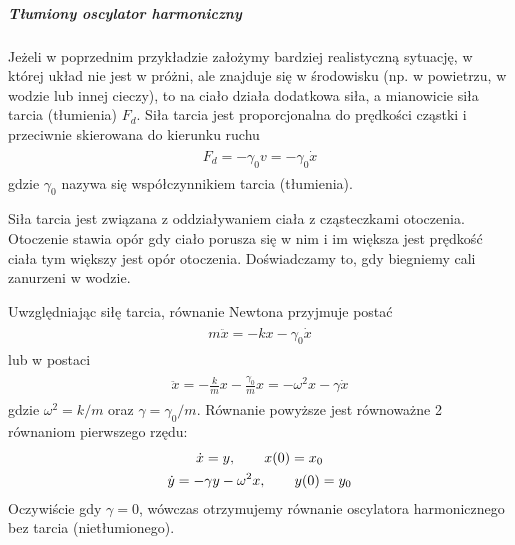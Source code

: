 \documentclass[a4paper,12pt,polish]{sphinxmanual}
\begin{document}
\subparagraph{Tłumiony oscylator harmoniczny}
\label{ch1/chI021:tlumiony-oscylator-harmoniczny}
Jeżeli w poprzednim przykładzie założymy bardziej realistyczną sytuację, w której  układ nie jest w próżni, ale znajduje się w środowisku (np. w powietrzu, w wodzie lub innej cieczy), to na ciało działa dodatkowa siła, a mianowicie siła tarcia  (tłumienia) $F_d$. Siła tarcia jest proporcjonalna do prędkości cząstki i przeciwnie skierowana do kierunku ruchu
\label{ch1/chI021:equation-eqn57}\begin{gather}
\begin{split}F_d = -\gamma_0 v = -\gamma_0 \dot x\end{split}\label{ch1/chI021-eqn57}
\end{gather}
gdzie $\gamma_0$ nazywa się współczynnikiem tarcia (tłumienia).

Siła tarcia jest związana z oddziaływaniem ciała z cząsteczkami otoczenia. Otoczenie stawia opór gdy ciało porusza się w nim i im większa jest prędkość ciała tym większy jest opór otoczenia. Doświadczamy to, gdy biegniemy cali zanurzeni w wodzie.

Uwzględniając siłę tarcia, równanie Newtona przyjmuje postać
\label{ch1/chI021:equation-eqn58}\begin{gather}
\begin{split}m\ddot x = -kx - \gamma_0 \dot x\end{split}\label{ch1/chI021-eqn58}
\end{gather}
lub w postaci
\label{ch1/chI021:equation-eqn58a}\begin{gather}
\begin{split}\ddot x = -\frac{k}{m} x - \frac{\gamma_0}{m} x = -\omega^2 x - \gamma \dot x\end{split}\label{ch1/chI021-eqn58a}
\end{gather}
gdzie $\omega^2 = k/m$  oraz $\gamma = \gamma_0/m$. Równanie  powyższe  jest równoważne 2 równaniom pierwszego rzędu:
\label{ch1/chI021:equation-eqn59}\begin{gather}
\begin{split}\dot x = y, \quad \quad x(0) = x_0\end{split}\label{ch1/chI021-eqn59}\\\begin{split}\dot y = -\gamma y -\omega^2 x, \quad \quad y(0) = y_0\end{split}\notag
\end{gather}
Oczywiście gdy $\gamma = 0$, wówczas  otrzymujemy równanie oscylatora harmonicznego bez tarcia (nietłumionego).
\end{document}
